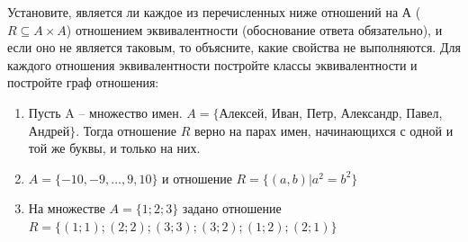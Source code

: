 \question
Установите, является ли каждое из перечисленных ниже отношений на А ($R \subseteq A \times A$) отношением эквивалентности (обоснование ответа обязательно), и если оно не является таковым, то объясните, какие свойства не выполняются. Для каждого отношения эквивалентности постройте классы эквивалентности и постройте граф отношения:
\begin{enumerate}
	\renewcommand{\labelenumi}{\alph{enumi})}
	\item Пусть A -- множество имен. $A = \{ $Алексей, Иван, Петр, Александр, Павел, Андрей$ \}$. Тогда отношение $R$ верно на парах имен, начинающихся с одной и той же буквы, и только на них.
	\item $A = \{-10, -9, ..., 9, 10\}$ и отношение $ R = \{(a,b)|a^{2} = b^{2}\}$
	\item На множестве $A = \{1; 2; 3\}$ задано отношение $R = \{(1; 1); (2; 2); (3; 3); (3; 2); (1; 2); (2; 1)\}$
\end{enumerate}